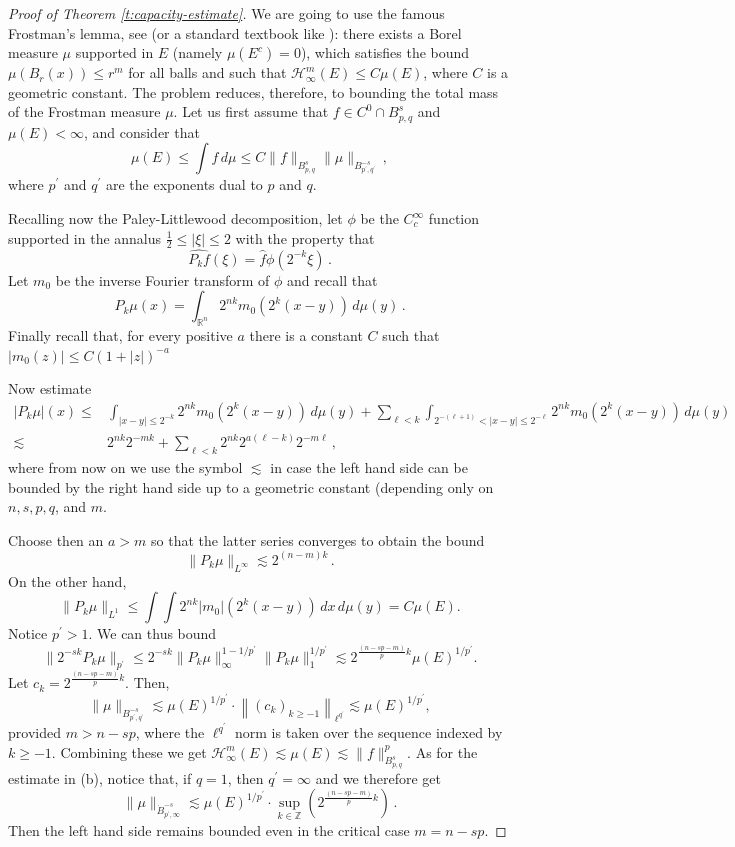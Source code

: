 \documentclass[11pt,reqno]{amsart}
\renewcommand{\H}{\mathcal{H}}
\newcommand{\Z}{{\mathbb Z}}
\theoremstyle{definition}
\numberwithin{equation}{section}
\begin{document}
\begin{proof}[Proof of Theorem \ref{t:capacity-estimate}]
We are going to use the famous Frostman's lemma, see \cite{Fro35} (or a standard textbook like \cite{Mat95}): there exists a Borel measure $\mu$ supported in $E$ (namely $\mu (E^c)=0$), which satisfies the bound $\mu(B_r (x))\le r^m$ for all balls and such that $\H^{m}_\infty(E)\le C\mu(E)$, where $C$ is a geometric constant. The problem reduces, therefore, to bounding the total mass of the Frostman measure $\mu$. Let us first assume that $f\in C^0\cap B^{s}_{p,q}$ and $\mu(E)<\infty$, and consider that
\[
\mu(E)\le\int f\,d\mu\le C\|f\|_{B^s_{p,q}}\|\mu\|_{B^{-s}_{p^\prime,q^\prime}}\, ,
\]
where $p^\prime$ and $q^\prime$ are the exponents dual to $p$ and $q$. 

Recalling now the Paley-Littlewood decomposition, let $\phi$ be the $C^\infty_c$ function supported in the annalus $\frac{1}{2} \leq |\xi|\leq 2$ with the property that 
\[
\widehat{P_k f} (\xi) = \hat{f} \phi (2^{-k} \xi)\, .
\]
Let $m_0$ be the inverse Fourier transform of $\phi$ and recall that 
\[
P_k \mu(x) = \int_{\mathbb{R}^n} 2^{nk} m_0(2^k(x-y)) \, d\mu(y)\, .
\]
Finally recall that, for every positive $a$ there is a constant $C$ such that $|m_0 (z)|\leq C (1+|z|)^{-a}$

Now estimate
\begin{align*}
|P_k\mu|(x) \le &\int_{|x-y|\le 2^{-k}}2^{nk}m_0(2^k(x-y))\,d\mu(y)+\sum_{\ell< k}\int_{2^{-(\ell+1)}<|x-y|\le 2^{-\ell}}2^{nk}m_0(2^k(x-y))\,d\mu(y)\\
\lesssim & 2^{nk}2^{-mk}+\sum_{\ell<k}2^{nk}2^{a(\ell-k)}2^{-m\ell}\, ,
\end{align*}
where from now on we use the symbol $\lesssim$ in case the left hand side can be bounded by the right hand side up to a geometric constant (depending only on $n,s,p,q$, and $m$.

Choose then an $a>m$ so that the latter series converges to obtain the bound
\[
\|P_k\mu\|_{L^\infty}\lesssim 2^{(n-m)k}\, .
\]
On the other hand,
\[\|P_k\mu\|_{L^1}\le \int\int 2^{nk}|m_0|(2^{k}(x-y))\,dx\,d\mu(y)=C\mu(E).\]
Notice $p^\prime>1$. We can thus bound
\[\|2^{-sk}P_k\mu\|_{p^\prime}\le 2^{-sk}\|P_k\mu\|_{\infty}^{1-1/p^\prime}\|P_k\mu\|_{1}^{1/p^\prime}\lesssim 2^{\frac{(n-sp-m)}{p}k}\mu(E)^{1/p^\prime}.\]
Let $c_k=2^{\frac{(n-sp-m)}{p}k}$. Then,
\[\|\mu\|_{B^{-s}_{p^\prime,q^\prime}}\lesssim \mu(E)^{1/p^\prime}\cdot \left\|(c_k)_{k\ge -1}\right\|_{\ell^{q^\prime}}\lesssim\mu(E)^{1/p^\prime},\]
provided $m>n-sp$, where the $\ell^{q^\prime}$ norm is taken over the sequence indexed by $k\ge -1$. Combining these we get $\H^m_\infty(E)\lesssim\mu(E)\lesssim \|f\|_{B^{s}_{p,q}}^p$.
As for the estimate in (b), notice that, if $q=1$, then $q^\prime=\infty$ and we therefore get
\[
\|\mu\|_{\dot{B}^{-s}_{p^\prime,\infty}}\lesssim \mu(E)^{1/p^\prime}\cdot\sup_{k\in\Z}\left(2^{\frac{(n-sp-m)}{p}k}\right)\, .
\]
Then the left hand side remains bounded even in the critical case $m=n-sp$.


\end{proof}
\end{document}
